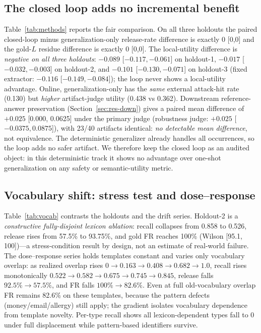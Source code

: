 \documentclass[11pt,a4paper]{article}
\begin{document}
\subsection{The closed loop adds no incremental benefit}\label{sec:res-loop}
Table~\ref{tab:methods} reports the fair comparison. On all three holdouts the paired closed-loop minus generalization-only release-rate difference is exactly 0 [0,0] and the gold-$L$ residue difference is exactly 0 [0,0]. The local-utility difference is \emph{negative on all three holdouts}: $-0.089$ [$-0.117,-0.061$] on holdout-1, $-0.017$ [$-0.032,-0.003$] on holdout-2, and $-0.101$ [$-0.130,-0.071$] on holdout-3 (fixed extractor: $-0.116$ [$-0.149,-0.084$]); the loop never shows a local-utility advantage. Online, generalization-only has the \emph{same} external attack-hit rate (0.130) but \emph{higher} artifact-judge utility (0.438 vs 0.362). Downstream reference-answer preservation (Section~\ref{sec:res-down}) gives a paired mean difference of $+0.025$ [0.000, 0.0625] under the primary judge (robustness judge: $+0.025$ [$-0.0375,0.0875$]), with 23/40 artifacts identical: \emph{no detectable mean difference}, not equivalence. The deterministic generalizer already handles all occurrences, so the loop adds no safer artifact. We therefore keep the closed loop as an audited object: in this deterministic track it shows no advantage over one-shot generalization on any safety or semantic-utility metric.

\subsection{Vocabulary shift: stress test and dose--response}\label{sec:res-vocab}
Table~\ref{tab:vocab} contrasts the holdouts and the drift series. Holdout-2 is a \emph{constructive fully-disjoint lexicon ablation}: recall collapses from 0.858 to 0.526, release rises from 57.5\% to 93.75\%, and gold FR reaches 100\% (Wilson [95.1, 100])---a stress-condition result by design, not an estimate of real-world failure. The dose--response series holds templates constant and varies only vocabulary overlap: as realized overlap rises $0\to0.163\to0.408\to0.682\to1.0$, recall rises monotonically $0.522\to0.582\to0.675\to0.745\to0.845$, release falls $92.5\%\to57.5\%$, and FR falls $100\%\to82.6\%$. Even at full old-vocabulary overlap FR remains 82.6\% on these templates, because the pattern defects (money/email/allergy) still apply; the gradient isolates vocabulary dependence from template novelty. Per-type recall shows all lexicon-dependent types fall to 0 under full displacement while pattern-based identifiers survive.
\end{document}
